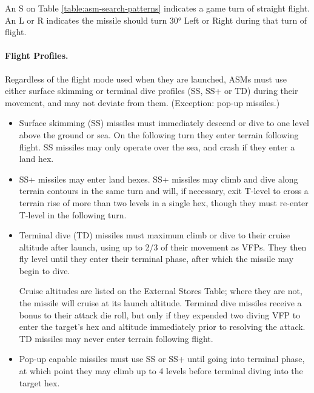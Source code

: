\begin{advancedrules}
\begin{itemize}
    An S on Table \ref{table:asm-search-patterns} indicates a game turn of straight flight.  An L or R indicates the missile should turn 30° Left or Right during that turn of flight.

    

\end{itemize}

\paragraph{Flight Profiles.}  Regardless of the flight mode used when they are launched, ASMs must use either surface skimming or terminal dive profiles (SS, SS+ or TD) during their movement, and may not deviate from them.  (Exception: pop-up missiles.)


\begin{itemize}

    \item Surface skimming (SS) missiles must immediately descend or dive to one level above the ground or sea.  On the following turn they enter terrain following flight.  SS missiles may only operate over the sea, and crash if they enter a land hex.

    \item SS+ missiles may enter land hexes.  SS+ missiles may climb and dive along terrain contours in the same turn and will, if necessary, exit T-level to cross a terrain rise of more than two levels in a single hex, though they must re-enter T-level in the following turn.

    \item Terminal dive (TD) missiles must maximum climb or dive to their cruise altitude after launch, using up to 2/3 of their movement as VFPs.  They then fly level until they enter their terminal phase, after which the missile may begin to dive.   

    Cruise altitudes are listed on the External Stores Table; where they are not, the missile will cruise at its launch altitude. Terminal dive missiles receive a bonus to their attack die roll, but only if they expended two diving VFP to enter the target's hex and altitude immediately prior to resolving the attack.  TD missiles may never enter terrain following flight.

    \item Pop-up capable missiles must use SS or SS+ until going into terminal phase, at which point they may climb up to 4 levels before terminal diving into the target hex.


\end{itemize}
\end{advancedrules}
